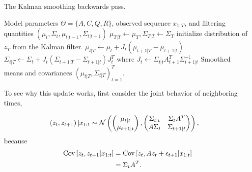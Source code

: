 \begin{algorithm}
   \caption{The Kalman smoothing backwards pass.}
   \label{alg:kalman_smoother}
\begin{algorithmic}
   Model parameters $\Theta = \{A, C, Q, R\}$,
    observed sequence $x_{1:T}$, and filtering quantities $\left(\mu_{t},
    \Sigma_{t}, \mu_{t \vert t - 1}, \Sigma_{t \vert t - 1}\right)$
    \STATE $\mu_{T \vert T} \leftarrow \mu_{T}, \Sigma_{T \vert T} \leftarrow
    \Sigma_{T}$ \hfill initialize distribution of $z_{T}$ from the Kalman
    filter.
    \STATE $\mu_{t \vert T} \leftarrow \mu_{t} + J_{t}\left(\mu_{t + 1 \vert T} - \mu_{t + 1 \vert t}\right)$
    \STATE $\Sigma_{t \vert T} \leftarrow \Sigma_{t} + J_{t}\left(\Sigma_{t + 1 \vert T} - \Sigma_{t + 1 \vert t}\right)J_{t}^{T}$
    \STATE where $J_{t} \leftarrow \Sigma_{t \vert t}A_{t + 1}^{T} \Sigma_{t + 1\vert t}^{-1}$
    \ENDFOR
     Smoothed means and covariances $\left(\mu_{t \vert T},
    \Sigma_{t \vert T}\right)_{t = 1}^{T}$.
\end{algorithmic}
\end{algorithm}

To see why this update works, first consider the joint behavior of neighboring
times,

\begin{align*}
   \left(z_{t}, z_{t + 1}\right) \vert x_{1:t} &\sim \mathcal{N}\left(
\begin{pmatrix}
  \mu_{t \vert t} \\
  \mu_{t + 1 \vert t}
\end{pmatrix},
\begin{pmatrix}
  \Sigma_{t \vert t} & \Sigma_{t} A^{T} \\
  A \Sigma_{t} & \Sigma_{t + 1 \vert t}
\end{pmatrix}\right),
\end{align*}
because
\begin{align*}
  \mathrm{Cov}\left[{z_{t}, z_{t + 1} \vert x_{1:t}}\right] &= \mathrm{Cov}\left[{z_{t}, Az_{t} + \epsilon_{t + 1} \vert x_{1:t}}\right] \\
  &= \Sigma_{t}A^{T}.
\end{align*}

